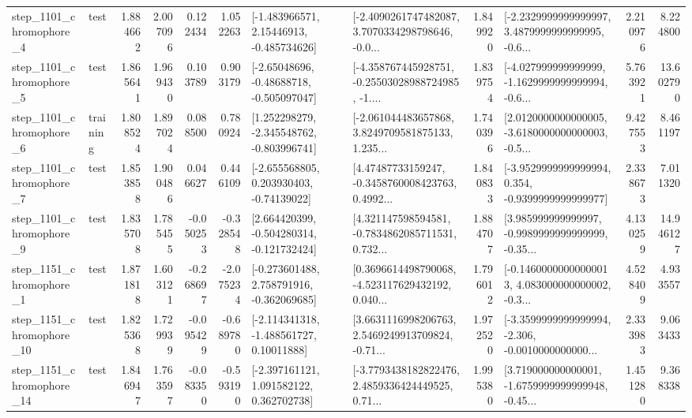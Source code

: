\begin{tabular}{llrrrrllrlrr}
  step\_1101\_chromophore\_4 &      test &      1.884662 &    2.007096 &      0.122434 &  1.052263 &    [-1.483966571, 2.15446913, -0.485734626] &  [-2.4090261747482087, 3.7070334298798646, -0.0... &       1.849920 &  [-2.2329999999999997, 3.4879999999999995, -0.6... &            2.210976 &          8.224800 \\
  step\_1101\_chromophore\_5 &      test &      1.865641 &    1.969430 &      0.103789 &  0.903179 &    [-2.65048696, -0.48688718, -0.505097047] &  [-4.358767445928751, -0.25503028988724985, -1.... &       1.839754 &  [-4.027999999999999, -1.1629999999999994, -0.6... &            5.763921 &         13.602790 \\
  step\_1101\_chromophore\_6 &  training &      1.808524 &    1.897024 &      0.088500 &  0.780924 &   [1.252298279, -2.345548762, -0.803996741] &  [-2.061044483657868, 3.8249709581875133, 1.235... &       1.740396 &  [2.0120000000000005, -3.6180000000000003, -0.5... &            9.427553 &          8.461197 \\
  step\_1101\_chromophore\_7 &      test &      1.853858 &    1.900486 &      0.046627 &  0.446109 &    [-2.655568805, 0.203930403, -0.74139022] &  [4.47487733159247, -0.3458760008423763, 0.4992... &       1.840833 &  [-3.9529999999999994, 0.354, -0.9399999999999977] &            2.338673 &          7.011320 \\
  step\_1101\_chromophore\_9 &      test &      1.835708 &    1.785455 &     -0.050253 & -0.328548 &   [2.664420399, -0.504280314, -0.121732424] &  [4.321147598594581, -0.7834862085711531, 0.732... &       1.884707 &  [3.985999999999997, -0.9989999999999999, -0.35... &            4.130259 &         14.946127 \\
  step\_1151\_chromophore\_1 &      test &      1.871818 &    1.603121 &     -0.268697 & -2.075234 &   [-0.273601488, 2.758791916, -0.362069685] &  [0.3696614498790068, -4.523117629432192, 0.040... &       1.796012 &  [-0.14600000000000013, 4.083000000000002, -0.3... &            4.528409 &          4.933557 \\
 step\_1151\_chromophore\_10 &      test &      1.825368 &    1.729939 &     -0.095429 & -0.689780 &    [-2.114341318, -1.488561727, 0.10011888] &  [3.6631116998206763, 2.5469249913709824, -0.71... &       1.972520 &  [-3.3599999999999994, -2.306, -0.0010000000000... &            2.333983 &          9.063433 \\
 step\_1151\_chromophore\_14 &      test &      1.846947 &    1.763597 &     -0.083350 & -0.593190 &    [-2.397161121, 1.091582122, 0.362702738] &  [-3.7793438182822476, 2.4859336424449525, 0.71... &       1.995380 &  [3.719000000000001, -1.6759999999999948, -0.45... &            1.451280 &          9.368338 \\

\end{tabular}
